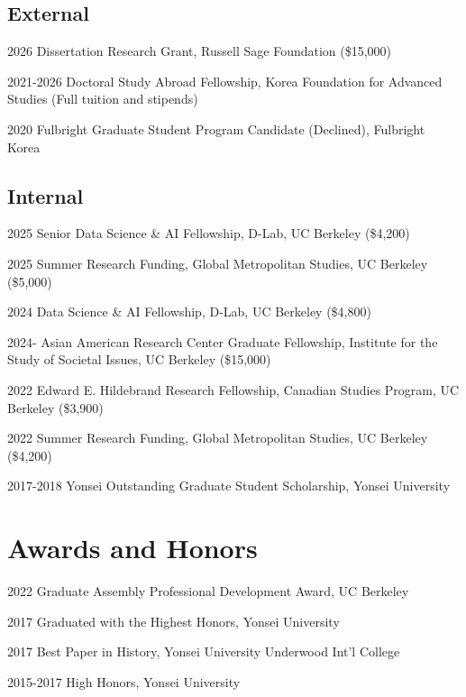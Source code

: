 \documentclass[12pt,letterpaper]{report}
\begin{document}
    \subsection*{External}
    \begin{tablist}
        \item[2026] \tab{}Dissertation Research Grant, Russell Sage Foundation (\$15,000)
        \item[2021-2026] \tab{}Doctoral Study Abroad Fellowship, Korea Foundation for Advanced Studies (Full tuition and stipends)
        \item[2020] \tab{}Fulbright Graduate Student Program Candidate (Declined), Fulbright Korea
    \end{tablist}
    \subsection*{Internal}
    \begin{tablist}
        \item[2025] \tab{}Senior Data Science \& AI Fellowship, D-Lab, UC Berkeley (\$4,200)
        \item[2025] \tab{}Summer Research Funding, Global Metropolitan Studies, UC Berkeley (\$5,000)
        \item[2024] \tab{}Data Science \& AI Fellowship, D-Lab, UC Berkeley (\$4,800)
        \item[2024-] \tab{}Asian American Research Center Graduate Fellowship, Institute for the Study of Societal Issues, UC Berkeley (\$15,000)
        \item[2022] \tab{}Edward E. Hildebrand Research Fellowship, Canadian Studies Program, UC Berkeley (\$3,900)
        \item[2022] \tab{}Summer Research Funding, Global Metropolitan Studies, UC Berkeley (\$4,200)
        \item[2017-2018] \tab{}Yonsei Outstanding Graduate Student Scholarship, Yonsei University
    \end{tablist}
    
\section*{Awards and Honors}
    \begin{tablist}
        \item[2022] \tab{}Graduate Assembly Professional Development Award, UC Berkeley
        \item[2017] \tab{}Graduated with the Highest Honors, Yonsei University
        \item[2017] \tab{}Best Paper in History, Yonsei University Underwood Int'l College
        \item[2015-2017] \tab{}High Honors, Yonsei University
    \end{tablist}
\end{document}
